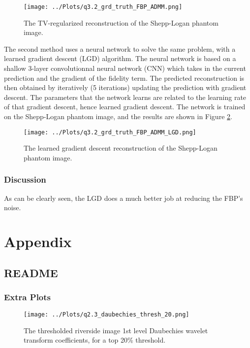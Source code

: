 \documentclass[12pt]{report} %
\begin{document}
\begin{figure}[htbp]
    \centering
    \texttt{[image: ../Plots/q3.2\_grd\_truth\_FBP\_ADMM.png]}
    \caption{The TV-regularized reconstruction of the Shepp-Logan phantom image.}
    \label{fig:tv_reconstruction}
\end{figure}

The second method uses a neural network to solve the same problem, with a learned gradient descent (LGD) algorithm. The neural network is based on a shallow 3-layer convolutionnal neural network (CNN) which takes in the current prediction and the gradient of the fidelity term. The predicted reconstruction is then obtained by iteratively (5 iterations) updating the prediction with gradient descent. The parameters that the network learns are related to the learning rate of that gradient descent, hence learned gradient descent. The network is trained on the Shepp-Logan phantom image, and the results are shown in Figure \ref{fig:learned_reconstruction}.

\begin{figure}[htbp]
    \centering
    \texttt{[image: ../Plots/q3.2\_grd\_truth\_FBP\_ADMM\_LGD.png]}
    \caption{The learned gradient descent reconstruction of the Shepp-Logan phantom image.}
    \label{fig:learned_reconstruction}
\end{figure}


\subsection{Discussion}

As can be clearly seen, the LGD does a much better job at reducing the FBP's noise.


\chapter{Appendix}

\section{README}

\subsection{Extra Plots}

\begin{figure}[htbp]
    \centering
    \texttt{[image: ../Plots/q2.3\_daubechies\_thresh\_20.png]}
    \caption{The thresholded riverside image 1st level Daubechies wavelet transform coefficients, for a top 20\% threshold.}
    \label{fig:thresholded_image20}
\end{figure}
\end{document}
